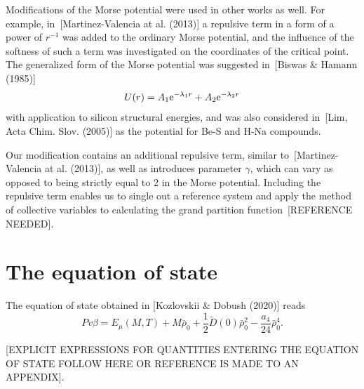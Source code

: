 \documentclass[12pt]{article}
\begin{document}
	Modifications of the Morse potential were used in other works as well. For example, in~[Martinez-Valencia at al. (2013)] a repulsive term in a form of a power of $r^{-1}$ was added to the ordinary Morse potential, and the influence of the softness of such a term was investigated on the coordinates of the critical point. The generalized form of the Morse potential was suggested in~[Biswas $\&$ Hamann (1985)]
	\begin{equation}
		U(r) = A_1 {\rm e}^{-\lambda_1 r} + A_2 {\rm e}^{-\lambda_2 r}
	\end{equation} 
	with application to silicon structural energies, and was also considered in~[Lim, Acta Chim. Slov. (2005)] as the potential for Be-S and H-Na compounds.
	
	Our modification contains an additional repulsive term, similar to~[Martinez-Valencia at al. (2013)], as well as introduces parameter $\gamma$, which can vary as opposed to being strictly equal to 2 in the Morse potential. Including the repulsive term enables us to single out a reference system and apply the method of collective variables to calculating the grand partition function~[REFERENCE NEEDED].
	
	\section{The equation of state}
	The equation of state obtained in [Kozlovskii $\&$ Dobush (2020)] reads
	\begin{equation}
		\label{eq:eos}
		Pv\beta = E_\mu(M, T) + M \bar \rho_0 + \frac{1}{2} \tilde D(0) \bar \rho_0^2 - \frac{a_4}{24} \bar \rho_0^4.
	\end{equation}
	
	[EXPLICIT EXPRESSIONS FOR QUANTITIES ENTERING THE EQUATION OF STATE FOLLOW HERE OR REFERENCE IS MADE TO AN APPENDIX].
	
\end{document}

